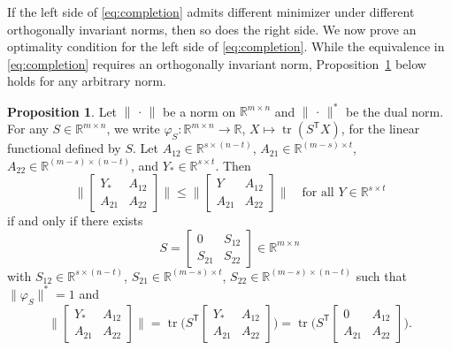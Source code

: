 \documentclass[11pt,reqno]{amsart}
\newcommand{\tp}{{\scriptscriptstyle\mathsf{T}}}
\DeclareMathOperator{\tr}{tr}
\theoremstyle{definition}
\newtheorem{proposition}[theorem]{Proposition}
\numberwithin{equation}{section}
\newcommand{\R}{\mathbb{R}}
\begin{document}
If the left side of \eqref{eq:completion} admits different minimizer under different orthogonally invariant norms, then so does the right side. We now prove an optimality condition for the left side of \eqref{eq:completion}. While the equivalence in \eqref{eq:completion} requires an  orthogonally invariant norm, Proposition~\ref{prop:complete} below holds for any arbitrary norm. 
\begin{proposition}\label{prop:complete}
Let $\lVert\,\cdot\,\rVert$ be a norm on $\R^{m\times n}$ and $\lVert\,\cdot\,\rVert^*$ be the dual norm. For any $S \in \R^{m \times n}$, we write $\varphi_S : \R^{m \times n} \to \R$, $X \mapsto \tr(S^\tp X)$, for the linear functional defined by $S$. Let $A_{12}\in \R^{s \times (n-t)}$, $A_{21}\in \R^{(m-s) \times t}$, $A_{22}\in \R^{(m-s) \times (n-t)}$, and $Y_* \in \R^{s \times t}$. 
Then
\[
\biggl\lVert \begin{bmatrix}
    Y_* & A_{12} \\
A_{21} & A_{22}
\end{bmatrix} \biggr\rVert \le \biggl\lVert \begin{bmatrix}
    Y & A_{12} \\
A_{21} & A_{22}
\end{bmatrix} \biggr\rVert \quad \text{for all } Y \in \R^{s \times t}
\]  if and only if there exists 
\begin{equation}\label{eq:R_form}
    S= \begin{bmatrix}
    0 & S_{12} \\
S_{21} & S_{22}
\end{bmatrix} \in \R^{m \times n}
\end{equation}
with $S_{12}\in \R^{s \times (n-t)}$, $S_{21}\in \R^{(m-s) \times t}$, $S_{22}\in \R^{(m-s) \times (n-t)}$ such that $\lVert \varphi_S \rVert^*=1$ and 
\begin{equation}\label{eq:completion_thm}
    \biggl\lVert \begin{bmatrix}
        Y_* & A_{12} \\
    A_{21} & A_{22}
    \end{bmatrix} \biggr\rVert = \tr\biggl(S^\tp \begin{bmatrix}
        Y_* & A_{12} \\
    A_{21} & A_{22}
    \end{bmatrix} \biggr) = \tr \biggl( S^\tp  \begin{bmatrix}
        0 & A_{12} \\
    A_{21} & A_{22}
    \end{bmatrix}  \biggr).
\end{equation}
\end{proposition}
\end{document}
